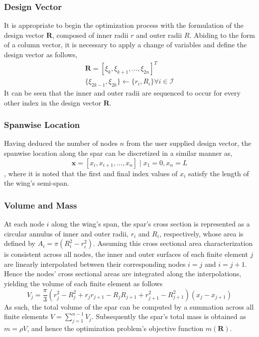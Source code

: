 \documentclass{article}
\begin{document}
\subsubsection{Design Vector}\label{R}
It is appropriate to begin the optimization process with the formulation of the design vector $\mathbf{R}$, composed of inner radii $r$ and outer radii $R$. Abiding to the form of a column vector, it is necessary to apply a change of variables and define the design vector as follows,
$$
\begin{gathered}
\mathbf{R} = [\xi_k, \xi_{k+1}, \dots, \xi_{2n}]^T \\
\{\xi_{2k-1}, \xi_{2k}\} \leftarrow \{r_i, R_i\} \forall i \in \mathcal{I}
\end{gathered}
$$
It can be seen that the inner and outer radii are sequenced to occur for every other index in the design vector $\mathbf{R}$.

\subsubsection{Spanwise Location}
Having deduced the number of nodes $n$ from the user supplied design vector, the spanwise location along the spar can be discretized in a similar manner as, $$ \mathbf{x} = [ x_i, x_{i+1}, \dots, x_n] \mid x_1 = 0 , x_n = L$$, where it is noted that the first and final index values of $x_i$ satisfy the length of the wing's semi-span.

\subsubsection{Volume and Mass}
At each node $i$ along the wing's span, the spar's cross section is represented as a circular annulus of inner and outer radii, $r_i$ and $R_i$, respectively, whose area is defined by $ A_i = \pi (R_i^2 - r_i^2) $. Assuming this cross sectional area characterization is consistent across all nodes, the inner and outer surfaces of each finite element $j$ are linearly interpolated between their corresponding nodes $i=j$ and $i=j+1$. Hence the nodes' cross sectional areas are integrated along the interpolations, yielding the volume of each finite element as follows
$$V_j = \frac{\pi}{3} (r_j^2 - R_j^2 + r_j r_{j+1} - R_j R_{j+1} + r_{j+1}^2 - R_{j+1}^2 )(x_j - x_{j+1}) $$ 
As such, the total volume of the spar can be computed by a summation across all finite elements $V=\sum_{j=1}^{n-1} V_j$. Subsequently the spar's total mass is obtained as $m=\rho V$, and hence the optimization problem's objective function $m(\mathbf{R})$.
\end{document}
